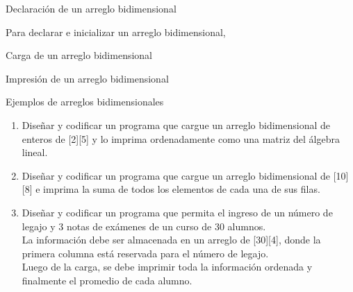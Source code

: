 \documentclass[xcolor=pdftex,table,11pt]{beamer}
\begin{document}
\begin{frame}{Declaración de un arreglo bidimensional}

\codesetstylefrombeamer
{}
\vspace{0.5cm}
\vspace{0.5cm}
Para declarar e inicializar un arreglo bidimensional, 
\codesetstylefrombeamer
{}


\end{frame}

\begin{frame}{Carga de un arreglo bidimensional}
\codesetstylefrombeamer
{}
\end{frame}

\begin{frame}{Impresión de un arreglo bidimensional}
\codesetstylefrombeamer
{}


\href{https://github.com/danis963/informaticaI_IUA/blob/main/c/src/8-array_2d_load_print.c}{}
\end{frame}


\begin{frame}{Ejemplos de arreglos bidimensionales}
 \begin{enumerate}
   
        \item Diseñar y codificar un programa que cargue un arreglo bidimensional de enteros de [2][5] y lo imprima ordenadamente como una matriz del álgebra lineal.
\href{https://github.com/danis963/informaticaI_IUA/blob/main/c/src/8-3arrays.c}{}

        \item Diseñar y codificar un programa que cargue un arreglo bidimensional de [10][8] e imprima la suma de todos los elementos de cada una de sus filas.
                
\href{https://github.com/danis963/informaticaI_IUA/blob/main/c/src/8-4arrays.c}{}


        \item Diseñar y codificar un programa que permita el ingreso de un número de legajo y 3 notas de exámenes de un curso de 30 alumnos. \\
        La información debe ser almacenada en un arreglo de [30][4], donde la primera columna está reservada para el número de legajo.\\
        Luego de la carga, se debe imprimir toda la información ordenada y finalmente el promedio de cada alumno.
\href{https://github.com/danis963/informaticaI_IUA/blob/main/c/src/8-5arrays.c}{}

   \end{enumerate}

 
\end{frame}
\end{document}
